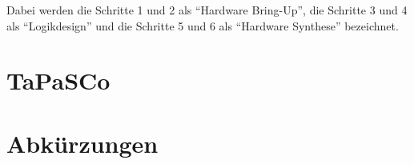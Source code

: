 \documentclass[a4paper, 11pt, accentcolor = tud3b]{tudreport}
\begin{document}
			Dabei werden die Schritte 1 und 2 als \enquote{Hardware Bring-Up}, die Schritte 3 und 4 als \enquote{Logikdesign} und die Schritte 5 und 6 als \enquote{Hardware Synthese} bezeichnet.
    
    \chapter{TaPaSCo}
    
    \chapter{Abkürzungen}
	    \begin{description}
	    \end{description}
\end{document}
